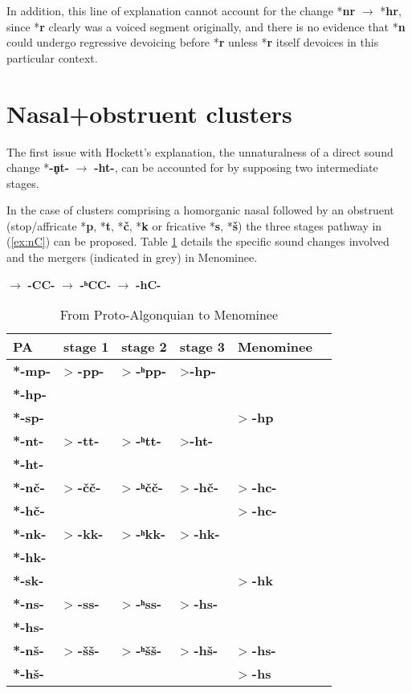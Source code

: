 \documentclass[oneside,a4paper,11pt]{article}
\newcommand{\ipa}[1]{{\phon\mbox{\textbf{#1}}}}
\newcommand{\grise}[1]{\cellcolor{lightgray}\textbf{#1}}
\newcommand{\change}[2]{*\ipa{#1} $\rightarrow$ *\ipa{#2}}
\begin{document}
In addition, this line of explanation cannot account for the change \change{nr}{hr}, since *\ipa{r} clearly was a voiced segment originally, and there is no evidence that *\ipa{n} could undergo regressive devoicing before *\ipa{r} unless *\ipa{r} itself devoices in this particular context.


\section{Nasal+obstruent clusters}
The first issue with Hockett's explanation, the unnaturalness of a direct sound change *\ipa{-n̥t-} $\rightarrow$ \ipa{-ht-}, can be accounted for by supposing two intermediate stages.

In the case of clusters comprising a homorganic nasal followed by an obstruent (stop/affricate *\ipa{p}, *\ipa{t}, *\ipa{č}, *\ipa{k} or fricative *\ipa{s}, *\ipa{š}) the three stages pathway in (\ref{ex:nC}) can be proposed. Table \ref{tab:gem} details the specific sound changes involved and the mergers (indicated in grey) in Menominee.

\begin{exe}
\ex \label{ex:nC}
\glt *\ipa{-nC-} $\rightarrow$ \ipa{-CC-} $\rightarrow$ \ipa{-ʰCC-} $\rightarrow$ \ipa{-hC-} 
\end{exe}

\begin{table}[H]
\caption{From Proto-Algonquian to Menominee} \label{tab:gem} \centering
\begin{tabular}{llllll}
\toprule
PA & stage 1 & stage 2 & stage 3& Menominee \\
\midrule
\ipa{*-mp-} & > \ipa{-pp-} & > \ipa{-ʰpp-} &\grise{} >\ipa{-hp-} &\grise{}  \\
\ipa{*-hp-} &   &   &\grise{}   &\grise{}  \\
\ipa{*-sp-} &   &   &   &>\grise{} \ipa{-hp} \\
\midrule
\ipa{*-nt-} & > \ipa{-tt-} & > \ipa{-ʰtt-} & \grise{} >\ipa{-ht-} &\grise{}  \\
\ipa{*-ht-} &   &   &\grise{}   &\grise{}  \\
\midrule
\ipa{*-nč-} & > \ipa{-čč-} & > \ipa{-ʰčč-} &> \grise{} \ipa{-hč-} &>\grise{} \ipa{-hc-}  \\
\ipa{*-hč-} &   &   &\grise{}   &>\grise{} \ipa{-hc-}  \\
\midrule
\ipa{*-nk-} &> \ipa{-kk-} &> \ipa{-ʰkk-} &> \grise{}\ipa{-hk-} &\grise{}  \\
\ipa{*-hk-} &   &   &\grise{}   &\grise{}  \\
\ipa{*-sk-} &   &   &   &>\grise{} \ipa{-hk} \\
\midrule
\ipa{*-ns-} &> \ipa{-ss-} &> \ipa{-ʰss-} &>\grise{} \ipa{-hs-} &\grise{}  \\
\ipa{*-hs-} &   &   &\grise{}   &\grise{}  \\
\cline{1-5}
\ipa{*-nš-} &> \ipa{-šš-} &> \ipa{-ʰšš-} &> \ipa{-hš-} \grise{}&>\grise{}  \ipa{-hs-}\\
\ipa{*-hš-} &   &   &   \grise{}&>\grise{} \ipa{-hs} \\
\bottomrule
\end{tabular}
\end{table}
\end{document}
